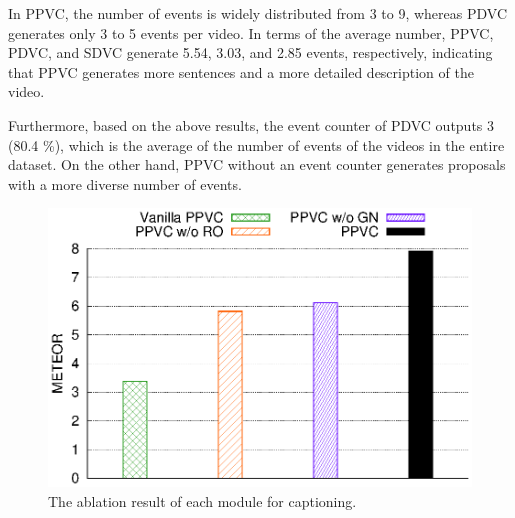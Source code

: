 In PPVC, the number of events is widely distributed from 3 to 9, whereas PDVC generates only 3 to 5 events per video.
In terms of the average number, PPVC, PDVC, and SDVC generate 5.54, 3.03, and 2.85 events, respectively, indicating that PPVC generates more sentences and a more detailed description of the video.

Furthermore, based on the above results, the event counter of PDVC outputs 3 (80.4 \%), which is the average of the number of events of the videos in the entire dataset.
On the other hand, PPVC without an event counter generates proposals with a more diverse number of events.





\begin{figure}[t]
  \centering
   \includegraphics[width=0.9\linewidth]{figures/ppvc_fig4}
   \caption{
    The ablation result of each module for captioning.
    }
   \label{fig:eval_ablation}
   \end{figure}

